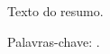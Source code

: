 \begin{resumo}
\vspace{-1cm}

\onehalfspacing

\noindent 
  Texto do resumo.
    
\vspace*{.75cm}

\noindent Palavras-chave: .\\

\end{resumo}
